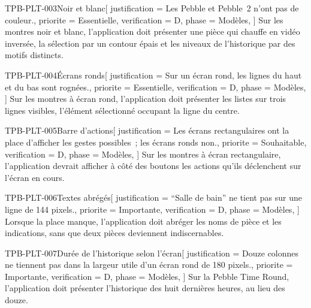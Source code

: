 \begin{exigence}{TPB-PLT-003}{Noir et blanc}[
    justification = {Les Pebble et Pebble~2 n'ont pas de couleur.},
    priorite      = {Essentielle},
    verification  = {D},
    phase         = {Modèles},
  ]
  Sur les montres noir et blanc, l'application doit présenter une pièce qui chauffe en
  vidéo inversée, la sélection par un contour épais et les niveaux de l'historique par des
  motifs distincts.
\end{exigence}

\begin{exigence}{TPB-PLT-004}{Écrans ronds}[
    justification = {Sur un écran rond, les lignes du haut et du bas sont rognées.},
    priorite      = {Essentielle},
    verification  = {D},
    phase         = {Modèles},
  ]
  Sur les montres à écran rond, l'application doit présenter les listes sur trois lignes
  visibles, l'élément sélectionné occupant la ligne du centre.
\end{exigence}

\begin{exigence}{TPB-PLT-005}{Barre d'actions}[
    justification = {Les écrans rectangulaires ont la place d'afficher les gestes
                     possibles~; les écrans ronds non.},
    priorite      = {Souhaitable},
    verification  = {D},
    phase         = {Modèles},
  ]
  Sur les montres à écran rectangulaire, l'application devrait afficher à côté des boutons
  les actions qu'ils déclenchent sur l'écran en cours.
\end{exigence}

\begin{exigence}{TPB-PLT-006}{Textes abrégés}[
    justification = {\enquote{Salle de bain} ne tient pas sur une ligne de 144 pixels.},
    priorite      = {Importante},
    verification  = {D},
    phase         = {Modèles},
  ]
  Lorsque la place manque, l'application doit abréger les noms de pièce et les
  indications, sans que deux pièces deviennent indiscernables.
\end{exigence}

\begin{exigence}{TPB-PLT-007}{Durée de l'historique selon l'écran}[
    justification = {Douze colonnes ne tiennent pas dans la largeur utile d'un écran rond de
                     180 pixels.},
    priorite      = {Importante},
    verification  = {D},
    phase         = {Modèles},
  ]
  Sur la Pebble Time Round, l'application doit présenter l'historique des huit dernières
  heures, au lieu des douze.
\end{exigence}

